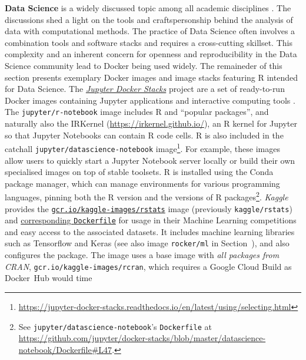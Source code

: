 \label{datascience} \textbf{Data Science} is a widely discussed topic
among all academic disciplines \citep[e.g.,][]{donoho_50_2017}. The
discussions shed a light on the tools and craftspersonship behind the
analysis of data with computational methods. The practice of Data
Science often involves a combination tools and software stacks and
requires a cross-cutting skillset. This complexity and an inherent
concern for openness and reproducibility in the Data Science community
lead to Docker being used widely. The remaineder of this section
presents exemplary Docker images and image stacks featuring R intended
for Data Science. The
\href{https://github.com/jupyter/docker-stacks/}{\emph{Jupyter Docker
Stacks}} project are a set of ready-to-run Docker images containing
Jupyter applications and interactive computing tools
\citep{project_jupyter_jupyter_2018}. The \texttt{jupyter/r-notebook}
image includes R and ``popular packages'', and naturally also the
IRKernel (\url{https://irkernel.github.io/}), an R kernel for Jupyter so
that Jupyter Notebooks can contain R code cells. R is also included in
the catchall \texttt{jupyter/datascience-notebook}
image\footnote{\href{https://jupyter-docker-stacks.readthedocs.io/en/latest/using/selecting.html}{https://jupyter-docker-stacks.readthedocs.io/en/latest/using/selecting.html}}.
For example, these images allow users to quickly start a Jupyter
Notebook server locally or build their own specialised images on top of
stable toolsets. R is installed using the Conda package manager, which
can manage environments for various programming languages, pinning both
the R version and the versions of R
packages\footnote{See \texttt{jupyter/datascience-notebook}'s \texttt{Dockerfile} at \href{https://github.com/jupyter/docker-stacks/blob/master/datascience-notebook/Dockerfile\#L47}{https://github.com/jupyter/docker-stacks/blob/master/datascience-notebook/Dockerfile\#L47}.}.
\emph{Kaggle} provides the
\href{https://hub.docker.com/r/kaggle/rstats}{\texttt{gcr.io/kaggle-images/rstats}}
image (previously \texttt{kaggle/rstats}) and
\href{https://github.com/Kaggle/docker-rstats}{corresponding
\texttt{Dockerfile}} for usage in their Machine Learning competitions
and easy access to the associated datasets. It includes machine learning
libraries such as Tensorflow and Keras (see also image
\texttt{rocker/ml} in Section~), and also configures
the  package. The image uses a base image with
\emph{all packages from CRAN}, \texttt{gcr.io/kaggle-images/rcran},
which requires a Google Cloud Build as Docker~Hub would time

